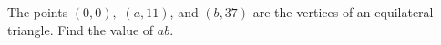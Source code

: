 The points $(0,0),$ $(a,11)$, and $(b,37)$ are the vertices of an equilateral triangle.  Find the value of $ab$.